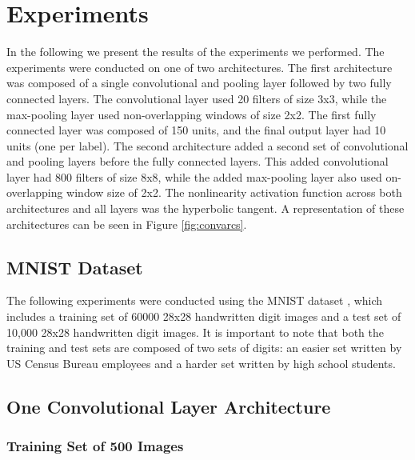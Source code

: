 \documentclass[10pt,twocolumn,letterpaper]{article}
\begin{document}
\section{Experiments}

In the following we present the results of the experiments we performed. The experiments were conducted
on one of two architectures. The first architecture was composed of a single convolutional and pooling
layer followed by two fully connected layers. The convolutional layer used 20 filters of size 3x3,
while the max-pooling layer used non-overlapping windows of size 2x2. The first fully connected layer
was composed of 150 units, and the final output layer had 10 units (one per label). The second
architecture added a second set of convolutional and pooling layers before the fully connected layers.
This added convolutional layer had 800 filters of size 8x8, while the added max-pooling layer also used
on-overlapping window size of 2x2. The nonlinearity activation function across both architectures and
all layers was the hyperbolic tangent. A representation of these architectures can be seen in Figure
\ref{fig:convarcs}.

\subsection{MNIST Dataset}

The following experiments were conducted using the MNIST dataset \cite{MNIST}, which includes a training set of
60000 28x28 handwritten digit images and a test set of 10,000 28x28 handwritten digit images.
It is important to note that both the training and test sets are composed of two sets of digits:
an easier set written by US Census Bureau employees and a harder set written by high school students.

\subsection{One Convolutional Layer Architecture}

\subsubsection{Training Set of 500 Images}
\end{document}
